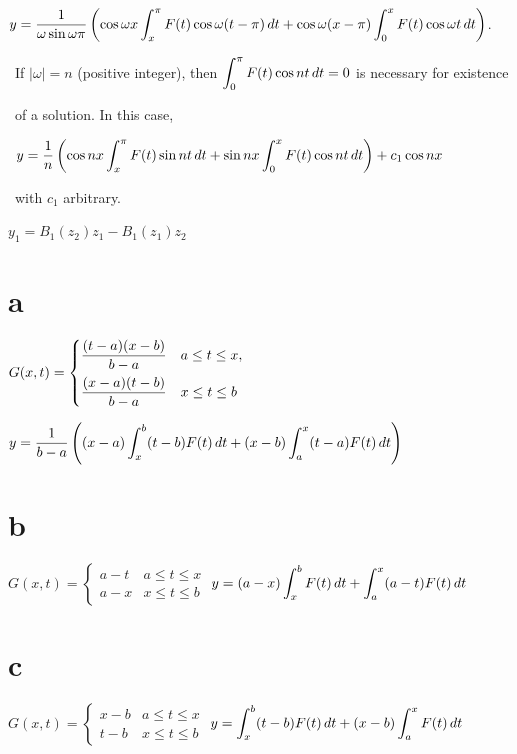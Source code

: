 \smallskip
\quad \quad
$y=\displaystyle{\frac{1}{\omega\sin\omega\pi}
\left(\cos\omega x\int_{x}^{\pi}F(t)\cos\omega(t-\pi)\,dt
+\cos\omega(x-\pi)\int_{0}^{x}F(t)\cos\omega t\,dt\right)}$.

\smallskip \quad\;   \,
If $|\omega|=n$ (positive integer), then $\displaystyle{\int_{0}^{\pi}F(t)\cos
nt\,dt=0}$ is necessary for existence

\quad\;   \,
of a solution. In this case,

\smallskip

\quad\;   \,
$y=\displaystyle{\frac{1}{n}\left(\cos nx\int_{x}^{\pi}F(t)\sin nt\,dt
+\sin nx\int_{0}^{x}F(t)\cos nt\,dt\right)+c_{1}\cos nx}$

\smallskip \quad\;   \,
 with $c_{1}$ arbitrary.

\medskip

  $y_{1}=B_{1}(z_{2})z_{1}-B_{1}(z_{1})z_{2}$

\smallskip

 \part{a}
$G(x,t)=
\begin{cases}
\displaystyle{\frac{(t-a)(x-b)}{b-a}}&a\le t\le x,\\[.11in]
\displaystyle{\frac{(x-a)(t-b)}{b-a}}&x\le t\le b
\end{cases}$

\quad  \quad\;
$y=\displaystyle{\frac{1}{b-a}\left((x-a)\int_{x}^{b}(t-b)F(t)\,dt+(x-b)\int_{a}^{x}(t-a)F(t)\,dt\right)}$

\smallskip
\quad\;
\part{b}\;
$G(x,t)=
\begin{cases}
a-t&a\le t\le x\\
a-x&x\le t\le b
\end{cases}$  \quad
$y=\displaystyle{(a-x)\int_{x}^{b}F(t)\,dt+\int_{a}^{x}(a-t)F(t)\,dt}$

\smallskip
\quad\;
\part{c}\;
$G(x,t)=
\begin{cases}
x-b&a\le t\le x\\
t-b&x\le t\le b
\end{cases}$  \quad
$y=\displaystyle{\int_{x}^{b}(t-b)F(t)\,dt+(x-b)\int_{a}^{x}F(t)\,dt}$

